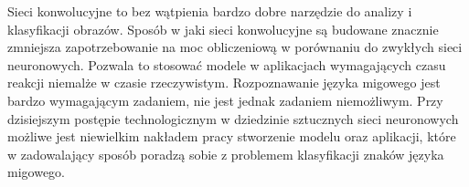 \documentclass[a4paper,12pt,oneside]{book} %
\begin{document}
Sieci konwolucyjne to bez wątpienia bardzo dobre narzędzie do analizy i klasyfikacji obrazów. Sposób w jaki sieci konwolucyjne są budowane znacznie zmniejsza zapotrzebowanie na moc obliczeniową w porównaniu do zwykłych sieci neuronowych. Pozwala to stosować modele w aplikacjach wymagających czasu reakcji niemalże w czasie rzeczywistym. Rozpoznawanie języka migowego jest bardzo wymagającym zadaniem, nie jest jednak zadaniem niemożliwym. Przy dzisiejszym postępie technologicznym w dziedzinie sztucznych sieci neuronowych możliwe jest niewielkim nakładem pracy stworzenie modelu oraz aplikacji, które w zadowalający sposób poradzą sobie z problemem klasyfikacji znaków języka migowego.

\listoftables{} %

\listoffigures{} %

\lstlistoflistings
{}



\end{document}

